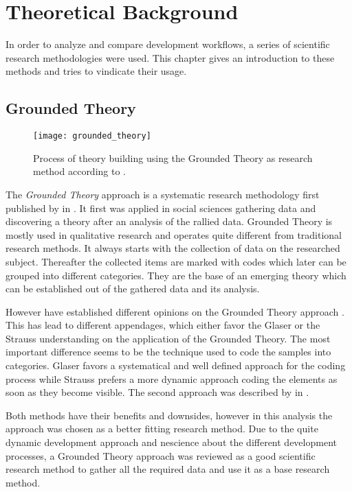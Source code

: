 \chapter{Theoretical Background} %
\label{chap:theoretical background}

In order to analyze and compare development workflows, a series of scientific
research methodologies were used. This chapter gives an introduction to these
methods and tries to vindicate their usage.

\section{Grounded Theory} %

\begin{figure}[htbp]
  \centering
  \texttt{[image: grounded\_theory]}
  \caption[Grounded Theory Process]
  {Process of theory building using the Grounded Theory as research method
    according to \citeauthor{Strauss1990} \cite{Pandit1996}.}
\end{figure}

The \emph{Grounded Theory} approach is a systematic research methodology first
published by \textcite{Glaser1967} in \citeyear{Glaser1967}. It first was
applied in social sciences gathering data and discovering a theory after an
analysis of the rallied data. Grounded Theory is mostly used in qualitative
research and operates quite different from traditional research methods. It
always starts with the collection of data on the researched subject. Thereafter
the collected items are marked with codes which later can be grouped into
different categories. They are the base of an emerging theory which can be
established out of the gathered data and its analysis.

However \citeauthor{Glaser1967} have established different opinions on the
Grounded Theory approach \cite{Heath2004}. This has lead to different
appendages, which either favor the Glaser or the Strauss understanding on the
application of the Grounded Theory. The most important difference seems to be
the technique used to code the samples into categories. Glaser favors a
systematical and well defined approach for the coding process while Strauss
prefers a more dynamic approach coding the elements as soon as they become
visible. The second approach was described by \textcite{Strauss1990} in
\citeyear{Strauss1990}.

Both methods have their benefits and downsides, however in this analysis the
\citeauthor{Strauss1990} approach was chosen as a better fitting research
method. Due to the quite dynamic development approach and nescience about the
different development processes, a Grounded Theory approach was reviewed as a
good scientific research method to gather all the required data and use it as a
base research method.

